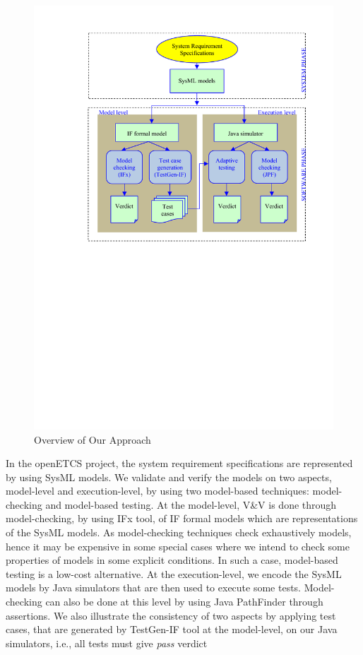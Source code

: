 \documentclass{template/openetcs_article}
\begin{document}
\begin{figure}[!htbp]
\begin{center}
  \includegraphics[width=.75\textwidth]{figures/TSP-approach.pdf}
  \caption{Overview of Our Approach}
  \label{fig:approach}
\end{center}
\end{figure}

In the openETCS project, the system requirement specifications are represented by using SysML models. We validate and verify the models on two aspects, model-level and execution-level, by using two model-based techniques: model-checking and model-based testing.
At the model-level, V\&V is done through model-checking, by using IFx tool, of IF formal models which are representations of the SysML models.
As model-checking techniques check exhaustively models, hence it may be expensive in some special cases where we intend to check some properties of models in some explicit conditions.
In such a case, model-based testing is a low-cost alternative.
At the execution-level, we encode the SysML models by Java simulators that are then used to execute some tests. Model-checking can also be done at this level by using Java PathFinder through assertions.
We also illustrate the consistency of two aspects by applying test cases, that are generated by TestGen-IF tool at the model-level, on our Java simulators, i.e., all tests must give {\em pass} verdict
\end{document}
